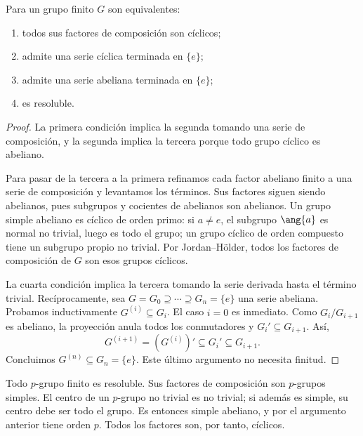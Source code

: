 \begin{prop}\label{prop:C8-resoluble}
Para un grupo finito $G$ son equivalentes:
\begin{enumerate}[nosep]
\item todos sus factores de composición son cíclicos;
\item admite una serie cíclica terminada en $\{e\}$;
\item admite una serie abeliana terminada en $\{e\}$;
\item es resoluble.
\end{enumerate}
\end{prop}
\begin{proof}
La primera condición implica la segunda tomando una serie de composición, y la segunda implica la tercera porque todo grupo cíclico es abeliano.

Para pasar de la tercera a la primera refinamos cada factor abeliano finito a una serie de composición y levantamos los términos. Sus factores siguen siendo abelianos, pues subgrupos y cocientes de abelianos son abelianos. Un grupo simple abeliano es cíclico de orden primo: si $a\ne e$, el subgrupo $\ang{a}$ es normal no trivial, luego es todo el grupo; un grupo cíclico de orden compuesto tiene un subgrupo propio no trivial. Por Jordan--Hölder, todos los factores de composición de $G$ son esos grupos cíclicos.

La cuarta condición implica la tercera tomando la serie derivada hasta el término trivial. Recíprocamente, sea $G=G_0\supseteq\cdots\supseteq G_n=\{e\}$ una serie abeliana. Probamos inductivamente $G^{(i)}\subseteq G_i$. El caso $i=0$ es inmediato. Como $G_i/G_{i+1}$ es abeliano, la proyección anula todos los conmutadores y $G_i'\subseteq G_{i+1}$. Así,
\[
G^{(i+1)}=(G^{(i)})'\subseteq G_i'\subseteq G_{i+1}.
\]
Concluimos $G^{(n)}\subseteq G_n=\{e\}$. Este último argumento no necesita finitud.
\end{proof}

\begin{ejem}
Todo $p$-grupo finito es resoluble. Sus factores de composición son $p$-grupos simples. El centro de un $p$-grupo no trivial es no trivial; si además es simple, su centro debe ser todo el grupo. Es entonces simple abeliano, y por el argumento anterior tiene orden $p$. Todos los factores son, por tanto, cíclicos.
\end{ejem}


